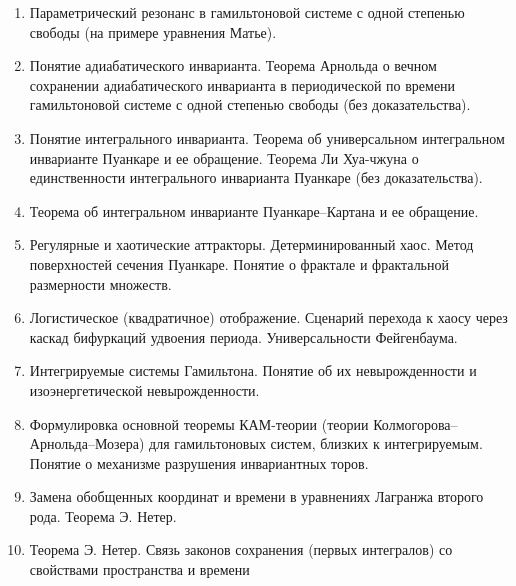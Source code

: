 \begin{enumerate}
\item Параметрический резонанс в гамильтоновой системе с одной степенью свободы (на примере уравнения Матье).

\item Понятие адиабатического инварианта. Теорема Арнольда о вечном сохранении адиабатического инварианта в периодической по времени гамильтоновой системе с одной степенью свободы (без доказательства).

\item Понятие интегрального инварианта. Теорема об универсальном интегральном инварианте Пуанкаре и ее обращение. Теорема Ли Хуа-чжуна о единственности интегрального инварианта Пуанкаре (без доказательства).

\item Теорема об интегральном инварианте Пуанкаре–Картана и ее обращение.

\item Регулярные и хаотические аттракторы. Детерминированный хаос. Метод поверхностей сечения Пуанкаре. Понятие о фрактале и фрактальной размерности множеств.

\item Логистическое (квадратичное) отображение. Сценарий перехода к хаосу через каскад бифуркаций удвоения периода. Универсальности Фейгенбаума.

\item Интегрируемые системы Гамильтона. Понятие об их невырожденности и изоэнергетической невырожденности.

\item Формулировка основной теоремы КАМ-теории (теории Колмогорова–Арнольда–Мозера) для гамильтоновых систем, близких к интегрируемым. Понятие о механизме разрушения инвариантных торов.

\item Замена обобщенных координат и времени в уравнениях Лагранжа второго рода. Теорема Э. Нетер.

\item Теорема Э. Нетер. Связь законов сохранения (первых интегралов) со свойствами пространства и времени
\end{enumerate}